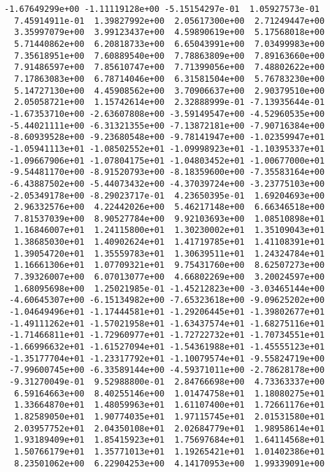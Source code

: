 \documentclass[11pt]{article}
\begin{document}
\begin{Verbatim}[commandchars=\\\{\}]
 -1.67649299e+00 -1.11119128e+00 -5.15154297e-01  1.05927573e-01
  7.45914911e-01  1.39827992e+00  2.05617300e+00  2.71249447e+00
  3.35997079e+00  3.99123437e+00  4.59890619e+00  5.17568018e+00
  5.71440862e+00  6.20818733e+00  6.65043991e+00  7.03499983e+00
  7.35618951e+00  7.60889540e+00  7.78863809e+00  7.89163660e+00
  7.91486597e+00  7.85610747e+00  7.71399056e+00  7.48802622e+00
  7.17863083e+00  6.78714046e+00  6.31581504e+00  5.76783230e+00
  5.14727130e+00  4.45908562e+00  3.70906637e+00  2.90379510e+00
  2.05058721e+00  1.15742614e+00  2.32888999e-01 -7.13935644e-01
 -1.67353710e+00 -2.63607808e+00 -3.59149547e+00 -4.52960535e+00
 -5.44021111e+00 -6.31321355e+00 -7.13872181e+00 -7.90716384e+00
 -8.60939528e+00 -9.23680548e+00 -9.78141947e+00 -1.02359947e+01
 -1.05941113e+01 -1.08502552e+01 -1.09998923e+01 -1.10395337e+01
 -1.09667906e+01 -1.07804175e+01 -1.04803452e+01 -1.00677000e+01
 -9.54481170e+00 -8.91520793e+00 -8.18359600e+00 -7.35583164e+00
 -6.43887502e+00 -5.44073432e+00 -4.37039724e+00 -3.23775103e+00
 -2.05349178e+00 -8.29023717e-01  4.23650395e-01  1.69204693e+00
  2.96332576e+00  4.22442026e+00  5.46217148e+00  6.66346518e+00
  7.81537039e+00  8.90527784e+00  9.92103693e+00  1.08510898e+01
  1.16846007e+01  1.24115800e+01  1.30230002e+01  1.35109043e+01
  1.38685030e+01  1.40902624e+01  1.41719785e+01  1.41108391e+01
  1.39054720e+01  1.35559783e+01  1.30639511e+01  1.24324784e+01
  1.16661306e+01  1.07709321e+01  9.75431760e+00  8.62507273e+00
  7.39326007e+00  6.07013077e+00  4.66802269e+00  3.20024597e+00
  1.68095698e+00  1.25021985e-01 -1.45212823e+00 -3.03465144e+00
 -4.60645307e+00 -6.15134982e+00 -7.65323618e+00 -9.09625202e+00
 -1.04649496e+01 -1.17444581e+01 -1.29206445e+01 -1.39802677e+01
 -1.49111262e+01 -1.57021958e+01 -1.63437574e+01 -1.68275116e+01
 -1.71466811e+01 -1.72960977e+01 -1.72722732e+01 -1.70734551e+01
 -1.66996632e+01 -1.61527094e+01 -1.54361988e+01 -1.45555123e+01
 -1.35177704e+01 -1.23317792e+01 -1.10079574e+01 -9.55824719e+00
 -7.99600745e+00 -6.33589144e+00 -4.59371011e+00 -2.78628178e+00
 -9.31270049e-01  9.52988800e-01  2.84766698e+00  4.73363337e+00
  6.59164663e+00  8.40255146e+00  1.01474758e+01  1.18080275e+01
  1.33664870e+01  1.48059963e+01  1.61107400e+01  1.72661176e+01
  1.82589050e+01  1.90774035e+01  1.97115745e+01  2.01531580e+01
  2.03957752e+01  2.04350108e+01  2.02684779e+01  1.98958614e+01
  1.93189409e+01  1.85415923e+01  1.75697684e+01  1.64114568e+01
  1.50766179e+01  1.35771013e+01  1.19265421e+01  1.01402386e+01
  8.23501062e+00  6.22904253e+00  4.14170953e+00  1.99339091e+00

\end{Verbatim}
\end{document}
